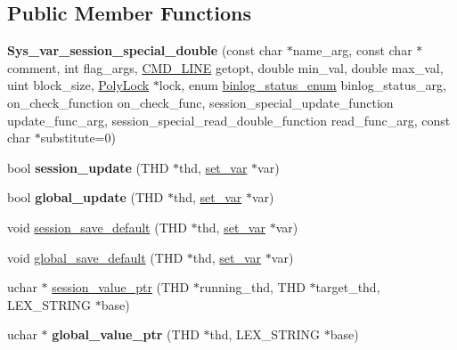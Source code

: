 \subsection*{Public Member Functions}
\begin{DoxyCompactItemize}
\item 
\mbox{\label{classSys__var__session__special__double_aaeb3d9912d8a295b8201e5e734e5d7f4}} 
{\bfseries Sys\+\_\+var\+\_\+session\+\_\+special\+\_\+double} (const char $\ast$name\+\_\+arg, const char $\ast$comment, int flag\+\_\+args, \mbox{\hyperlink{structCMD__LINE}{C\+M\+D\+\_\+\+L\+I\+NE}} getopt, double min\+\_\+val, double max\+\_\+val, uint block\+\_\+size, \mbox{\hyperlink{classPolyLock}{Poly\+Lock}} $\ast$lock, enum \mbox{\hyperlink{classsys__var_a664520ec82191888717c86085bfa83ce}{binlog\+\_\+status\+\_\+enum}} binlog\+\_\+status\+\_\+arg, on\+\_\+check\+\_\+function on\+\_\+check\+\_\+func, session\+\_\+special\+\_\+update\+\_\+function update\+\_\+func\+\_\+arg, session\+\_\+special\+\_\+read\+\_\+double\+\_\+function read\+\_\+func\+\_\+arg, const char $\ast$substitute=0)
\item 
\mbox{\label{classSys__var__session__special__double_a5248bab154043a84d0b919a44661d2c9}} 
bool {\bfseries session\+\_\+update} (T\+HD $\ast$thd, \mbox{\hyperlink{classset__var}{set\+\_\+var}} $\ast$var)
\item 
\mbox{\label{classSys__var__session__special__double_a88c37a7f3d553333b8a44867ceaf7756}} 
bool {\bfseries global\+\_\+update} (T\+HD $\ast$thd, \mbox{\hyperlink{classset__var}{set\+\_\+var}} $\ast$var)
\item 
void \mbox{\hyperlink{classSys__var__session__special__double_ae1b1d7ae1d78d24bf79e90477f6ee703}{session\+\_\+save\+\_\+default}} (T\+HD $\ast$thd, \mbox{\hyperlink{classset__var}{set\+\_\+var}} $\ast$var)
\item 
void \mbox{\hyperlink{classSys__var__session__special__double_a51caca194ef88ed7c473afa332c43b1a}{global\+\_\+save\+\_\+default}} (T\+HD $\ast$thd, \mbox{\hyperlink{classset__var}{set\+\_\+var}} $\ast$var)
\item 
uchar $\ast$ \mbox{\hyperlink{classSys__var__session__special__double_a0469d552abad9ba290266fe16a87528e}{session\+\_\+value\+\_\+ptr}} (T\+HD $\ast$running\+\_\+thd, T\+HD $\ast$target\+\_\+thd, L\+E\+X\+\_\+\+S\+T\+R\+I\+NG $\ast$base)
\item 
\mbox{\label{classSys__var__session__special__double_ab148e695b0e5442a1bfeb5953de76692}} 
uchar $\ast$ {\bfseries global\+\_\+value\+\_\+ptr} (T\+HD $\ast$thd, L\+E\+X\+\_\+\+S\+T\+R\+I\+NG $\ast$base)
\end{DoxyCompactItemize}

